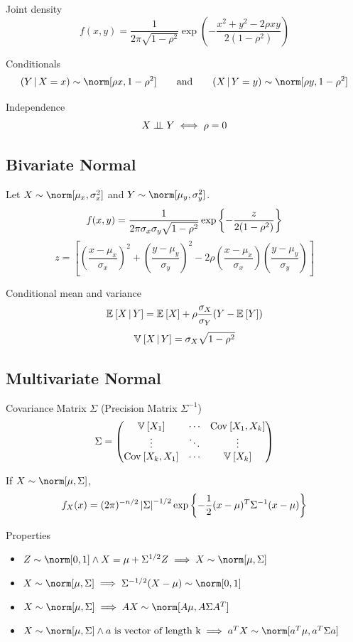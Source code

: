 \documentclass[landscape]{article}
\newenvironment{titemize}[1]{
  \begin{minipage}[h]{\columnwidth}
    #1
    \begin{itemize}
}{
    \end{itemize}
  \end{minipage}
}
\begin{document}
\begin{multicols*}{2}
Joint density
$$f(x,y) = \frac{1}{2 \pi \sqrt{1-\rho^2}}
  \exp
  \left(
  -\frac{x^2 + y^2 - 2\rho x y}{2 (1-\rho^2)}
  \right)
$$

Conditionals
$$
(Y\giv X=x) \dist \norm[\rho x,1-\rho^2] \qquad\text{and}\qquad
(X\giv Y=y) \dist \norm[\rho y,1-\rho^2]
$$

Independence 
$$X \perp\!\!\!\perp Y \;\Longleftrightarrow\; \rho = 0$$

\subsection{Bivariate Normal}

Let $X\dist\norm[\mu_x,\sigma_x^2]$ and $Y\dist\norm[\mu_y,\sigma_y^2]$.
$$f(x,y) = \frac{1}{2 \pi \sigma_x \sigma_y \sqrt{1-\rho^2}}
\exp\left\{-\frac{z}{2 (1-\rho^2)}\right\}$$
$$ z = 
  \left[
  \left(\frac{x-\mu_x}{\sigma_x}\right)^2 
    + \left(\frac{y-\mu_y}{\sigma_y}\right)^2
    - 2\rho\left(\frac{x-\mu_x}{\sigma_x}\right)
      \left(\frac{y-\mu_y}{\sigma_y}\right)
  \right]
$$

Conditional mean and variance
$$\mathbb{E}_{}\left[X\,|\, Y\right] = \mathbb{E}_{}\left[X\right] + \rho\frac{\sigma_X}{\sigma_Y}(Y-\mathbb{E}_{}\left[Y\right])$$
$$\mathbb{V}_{}\left[X\,|\, Y\right] = \sigma_X \sqrt{1-\rho^2}$$

\subsection{Multivariate Normal}

Covariance Matrix $\Sigma$ \quad (Precision Matrix $\Sigma^{-1}$)
$$\Sigma = 
  \begin{pmatrix}
  \mathbb{V}_{}\left[X_1\right] & \cdots & \mathrm{Cov}_{}\left[X_1,X_k\right] \\
  \vdots & \ddots & \vdots \\
  \mathrm{Cov}_{}\left[X_k,X_1\right] & \cdots & \mathbb{V}_{}\left[X_k\right]
  \end{pmatrix}$$

If $X \dist \norm[\mu,\Sigma]$,
$$f_X(x) = (2\pi)^{-n/2} \left|\Sigma\right|^{-1/2} 
\exp\left\{-\frac{1}{2}(x-\mu)^T\Sigma^{-1}(x-\mu)\right\} $$

\begin{titemize}{Properties}
  \item $Z \dist \norm[0,1] \wedge X = \mu+\Sigma^{1/2}Z 
    \imp X \dist \norm[\mu,\Sigma]$
  \item $X \dist \norm[\mu,\Sigma] \imp \Sigma^{-1/2}(X-\mu) \dist \norm[0,1]$
  \item $X \dist \norm[\mu,\Sigma] \imp AX \dist \norm[A\mu, A\Sigma A^T]$
  \item $X \dist \norm[\mu,\Sigma] \wedge a \text{ is vector of length k}
    \imp a^TX \dist \norm[a^T\mu, a^T\Sigma a]$
\end{titemize}


\end{multicols*}
\end{document}
